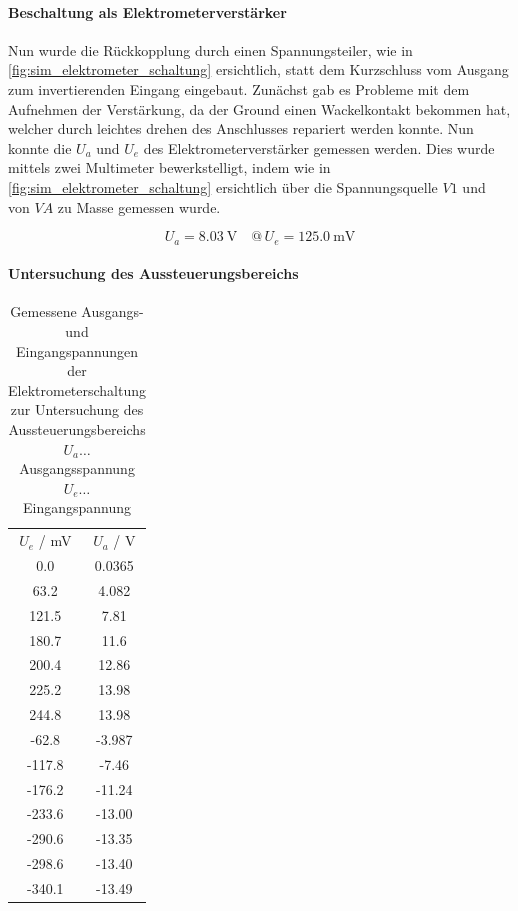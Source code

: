 \documentclass[12pt,english,ngerman]{scrartcl}
\begin{document}
\paragraph{Beschaltung als Elektrometerverstärker}
Nun wurde die Rückkopplung durch einen Spannungsteiler, wie in
\autoref{fig:sim_elektrometer_schaltung} ersichtlich, statt dem Kurzschluss vom
Ausgang zum invertierenden Eingang eingebaut. Zunächst gab es Probleme mit dem
Aufnehmen der Verstärkung, da der Ground einen Wackelkontakt bekommen hat,
welcher durch leichtes drehen des Anschlusses repariert werden konnte.
Nun konnte die $U_a$ und $U_e$ des Elektrometerverstärker gemessen werden. Dies
wurde mittels zwei Multimeter bewerkstelligt, indem wie in
\autoref{fig:sim_elektrometer_schaltung} ersichtlich über die Spannungsquelle
$V1$ und von $VA$ zu Masse gemessen wurde.

\begin{equation}
  U_a = \SI{8.03}{\volt} \quad @\, U_e = \SI{125.0}{\milli\volt}
  \label{eq:messwert_elektro_ausgang_eingang}
\end{equation}

\paragraph{Untersuchung des Aussteuerungsbereichs} \label{sec:Versuchohnekond}


\begin{table}[H]
  \caption{Gemessene Ausgangs- und Eingangspannungen der Elektrometerschaltung
  zur Untersuchung des Aussteuerungsbereichs\\
  $U_a \dots$ Ausgangsspannung \\
  $U_e \dots$ Eingangspannung \\
  }
  \label{tab:mess_elektro_aussteurerung}
  \centering
    \begin{tabular}[c]{S|S}
      {$U_e$ / \si{\milli\volt}} & {$U_a$ / \si{\volt}} \\
      0.0 & 0.0365 \\
      63.2 & 4.082 \\
      121.5 & 7.81 \\
      180.7 & 11.6 \\
      200.4 & 12.86 \\
      225.2 & 13.98 \\
      244.8 & 13.98 \\
      -62.8 & -3.987 \\
      -117.8 & -7.46 \\
      -176.2 & -11.24 \\
      -233.6 & -13.00 \\
      -290.6 & -13.35 \\
      -298.6 & -13.40 \\
      -340.1 & -13.49 \\
    \end{tabular}
\end{table}
\end{document}
